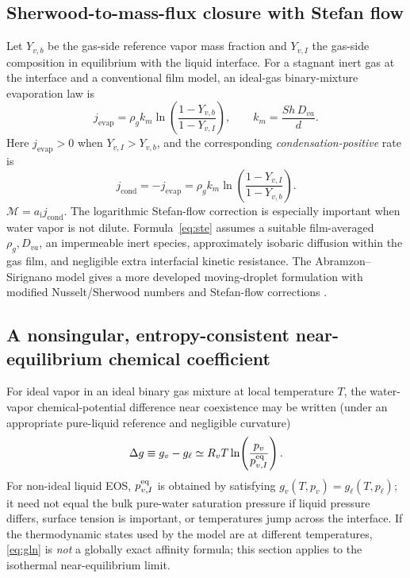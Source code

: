 \documentclass[11pt,letterpaper]{article}
\newcommand{\mi}{\mathrm{i}}
\newcommand{\area}{a_\mi}
\newcommand{\jcond}{j_{\mathrm{cond}}}
\newcommand{\jevap}{j_{\mathrm{evap}}}
\newcommand{\mcal}{\mathcal{M}}
\begin{document}
\subsection{Sherwood-to-mass-flux closure with Stefan flow}
Let $Y_{v,b}$ be the gas-side reference vapor mass fraction and $Y_{v,I}$ the gas-side composition in equilibrium with the liquid interface. For a stagnant inert gas at the interface and a conventional film model, an ideal-gas binary-mixture evaporation law is
\begin{equation}\label{eq:ste}
\jevap=\rho_g k_m\ln\!\left(\frac{1-Y_{v,b}}{1-Y_{v,I}}\right),
\qquad k_m=\frac{Sh\,D_{va}}{d}.
\end{equation}
Here $\jevap>0$ when $Y_{v,I}>Y_{v,b}$, and the corresponding \emph{condensation-positive} rate is
\begin{equation}\label{eq:cond}
\boxed{\jcond=-\jevap=\rho_g k_m\ln\!\left(\frac{1-Y_{v,I}}{1-Y_{v,b}}\right).}
\end{equation}
$\mcal=\area\jcond$. The logarithmic Stefan-flow correction is especially important when water vapor is not dilute. Formula~\eqref{eq:ste} assumes a suitable film-averaged $\rho_g,D_{va}$, an impermeable inert species, approximately isobaric diffusion within the gas film, and negligible extra interfacial kinetic resistance. The Abramzon--Sirignano model gives a more developed moving-droplet formulation with modified Nusselt/Sherwood numbers and Stefan-flow corrections \cite{AbramzonSirignano1989}.

\subsection{A nonsingular, entropy-consistent near-equilibrium chemical coefficient}
For ideal vapor in an ideal binary gas mixture at local temperature $T$, the water-vapor chemical-potential difference near coexistence may be written (under an appropriate pure-liquid reference and negligible curvature)
\begin{equation}\label{eq:gln}
\Delta g\equiv g_v-g_\ell\simeq R_vT\ln\!\left(\frac{p_v}{p_{v,I}^{\rm eq}}\right).
\end{equation}
For non-ideal liquid EOS, $p_{v,I}^{\rm eq}$ is obtained by satisfying $g_v(T,p_v)=g_\ell(T,p_\ell)$; it need not equal the bulk pure-water saturation pressure if liquid pressure differs, surface tension is important, or temperatures jump across the interface. If the thermodynamic states used by the model are at different temperatures, \eqref{eq:gln} is \emph{not} a globally exact affinity formula; this section applies to the isothermal near-equilibrium limit.
\end{document}
